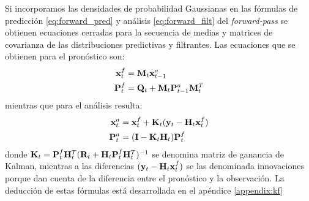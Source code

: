 Si incorporamos las densidades de probabilidad Gaussianas en las fórmulas de predicción \ref{eq:forward_pred} y análisis \ref{eq:forward_filt} del \textit{forward-pass} se obtienen ecuaciones cerradas para la secuencia de medias y matrices de covarianza de las distribuciones predictivas y filtrantes. Las ecuaciones que se obtienen para el pronóstico son:
\begin{align}
    \mathbf{x}_t^f &= \mathbf{M}_t \mathbf{x}_{t-1}^a \label{eq:kf_mean_pred}\\ 
    \mathbf{P}_t^f &= \mathbf{Q}_t + \mathbf{M}_t \mathbf{P}_{t-1}^a \mathbf{M}_t^T \label{eq:kf_var_pred}
\end{align}
mientras que para el análisis resulta:
\begin{align}
    \mathbf{x}_t^a &= \mathbf{x}_t^f + \mathbf{K}_t (\mathbf{y}_t - \mathbf{H}_t \mathbf{x}_t^f) \label{eq:kf_mean_filter} \\ 
    \mathbf{P}_t^a &= (\mathbf{I} - \mathbf{K}_t \mathbf{H}_t) \mathbf{P}_t^f \label{eq:kf_var_filter}
\end{align}
donde $\mathbf{K}_t = \mathbf{P}_t^f \mathbf{H}_t^T(\mathbf{R}_t + \mathbf{H}_t \mathbf{P}_t^f \mathbf{H}_t^T)^{-1}$ se denomina matriz de ganancia de Kalman, mientras a las diferencias $(\mathbf{y}_t - \mathbf{H}_t \mathbf{x}_t^f)$ se las denominada innovaciones porque dan cuenta de la diferencia entre el pronóstico y la observación. La deducción de estas fórmulas está desarrollada en el apéndice \ref{appendix:kf}

